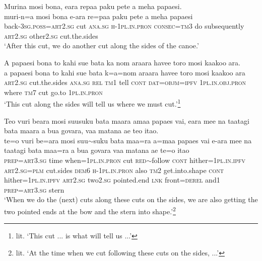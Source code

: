 \ea\label{ex:text16-19}
Murina mosi bona, eara repaa paku pete a meha papaesi.\\
\gll muri-n=a	mosi	bona	e-ara	re=paa	paku	pete	a	meha	papaesi\\
     back-3\textsc{sg}.\textsc{poss}=\textsc{art}2.\textsc{sg}	cut	\textsc{ana}.\textsc{sg}	\textsc{h}-1\textsc{pl}.\textsc{in}.\textsc{pron}	\textsc{consec}=\textsc{tm}3	do	subsequently	\textsc{art}2.\textsc{sg}	other2.\textsc{sg}	cut.the.sides\\
\glt `After this cut, we do another cut along the sides of the canoe.'
\z

\newpage
\ea\label{ex:text16-20}
A papaesi bona to kahi sue bata ka nom araara havee toro mosi kaakoo ara.\\
\gll a	papaesi	bona	to	kahi	sue	bata	k=a=nom	araara	havee	toro	mosi	kaakoo	ara\\
     \textsc{art}2.\textsc{sg}	cut.the.sides	\textsc{ana}.\textsc{sg}	\textsc{rel}	\textsc{tm}1	tell	\textsc{cont}	\textsc{dat}=\textsc{objm}=\textsc{ipfv}	1\textsc{pl}.\textsc{in}.\textsc{obj}.\textsc{pron}	where	\textsc{tm}7	cut	go.to	1\textsc{pl}.\textsc{in}.\textsc{pron}\\
\glt `This cut along the sides will tell us where we must cut.'\footnote{lit. `This cut ... is what will tell us ...'}
\z

\ea\label{ex:text16-21}
Teo vuri beara mosi suusuku bata maara amaa papaes vai, eara mee na taatagi bata maara a bua govara, vaa matana ae teo itao.\\
\gll te=o	vuri	be=ara	mosi	suu{$\sim$}suku	bata	maa=ra	a=maa	papaes	vai	e-ara	mee	na	taatagi	bata	maa=ra	a	bua	govara	vaa	matana	ae	te=o	itao\\
     \textsc{prep}=\textsc{art}3.\textsc{sg}	time	when=1\textsc{pl}.\textsc{in}.\textsc{pron}	cut	\textsc{red}{$\sim$}follow	\textsc{cont}	hither=1\textsc{pl}.\textsc{in}.\textsc{ipfv}	\textsc{art}2.\textsc{sg}=\textsc{plm}	cut.sides	\textsc{dem}6	\textsc{h}-1\textsc{pl}.\textsc{in}.\textsc{pron}	also	\textsc{tm}2	get.into.shape	\textsc{cont}	hither=1\textsc{pl}.\textsc{in}.\textsc{ipfv}	\textsc{art}2.\textsc{sg}	two2.\textsc{sg}	pointed.end	\textsc{lnk}	front=\textsc{derel}	and1	\textsc{prep}=\textsc{art}3.\textsc{sg}	stern\\
\glt `When we do the (next) cuts along these cuts on the sides, we are also getting the two pointed ends at the bow and the stern into shape.'\footnote{lit. `At the time when we cut following these cuts on the sides, ...'}
\z

